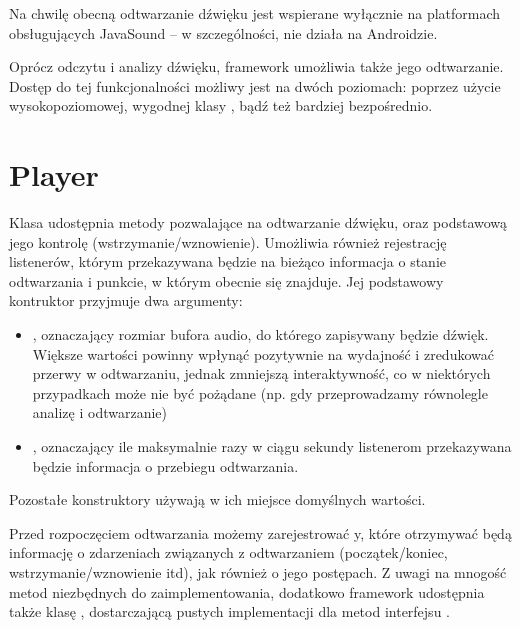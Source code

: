 \begin{Important}
Na chwilę obecną odtwarzanie dźwięku jest wspierane wyłącznie na platformach obsługujących JavaSound
-- w szczególności, nie działa na Androidzie.
\end{Important}

Oprócz odczytu i analizy dźwięku, framework umożliwia także jego odtwarzanie. Dostęp do tej
funkcjonalności możliwy jest na dwóch poziomach: poprzez użycie wysokopoziomowej, wygodnej klasy
, bądź też bardziej bezpośrednio.

\section{Player}

Klasa  udostępnia metody pozwalające na odtwarzanie dźwięku, oraz podstawową jego
kontrolę (wstrzymanie/wznowienie). Umożliwia również rejestrację listenerów, którym przekazywana
będzie na bieżąco informacja o stanie odtwarzania i punkcie, w którym obecnie się znajduje. Jej
podstawowy kontruktor przyjmuje dwa argumenty:

\begin{itemize}

  \item {}, oznaczający rozmiar bufora audio, do którego zapisywany będzie dźwięk.
    Większe wartości powinny wpłynąć pozytywnie na wydajność i zredukować przerwy w odtwarzaniu,
    jednak zmniejszą interaktywność, co w niektórych przypadkach może nie być pożądane (np. gdy
    przeprowadzamy równolegle analizę i odtwarzanie)

  \item {}, oznaczający ile maksymalnie razy w ciągu sekundy listenerom przekazywana
    będzie informacja o przebiegu odtwarzania.

\end{itemize}

Pozostałe konstruktory używają w ich miejsce domyślnych wartości.

Przed rozpoczęciem odtwarzania możemy zarejestrować y, które otrzymywać będą
informację o zdarzeniach związanych z odtwarzaniem (początek/koniec, wstrzymanie/wznowienie itd),
jak również o jego postępach. Z uwagi na mnogość metod niezbędnych do zaimplementowania, dodatkowo
framework udostępnia także klasę , dostarczającą pustych implementacji dla
metod interfejsu .

